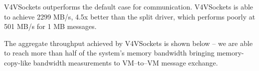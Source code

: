 \documentclass[a0paper,portrait,final]{baposter}
\begin{document}
\begin{poster}
{\begin{multicols}{2}
V4VSockets outperforms the default case for communication. V4VSockets is able
to achieve 2299 MB/s, 4.5x better than the split driver, which performs poorly
at 501 MB/s for 1 MB messages.

The aggregate throughput achieved by V4VSockets is shown below -- we are able to reach more than half of the system's memory bandwidth%
bringing memory-copy-like bandwidth measurements to VM--to--VM message exchange.

\end{multicols}

}

\end{poster}
\end{document}
